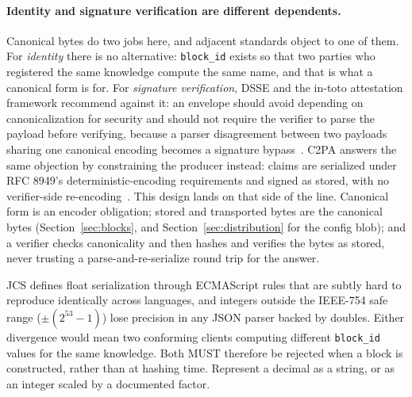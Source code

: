 \documentclass[11pt,a4paper]{article}
\begin{document}
\paragraph{Identity and signature verification are different dependents.}
Canonical bytes do two jobs here, and adjacent standards object to one of
them. For \emph{identity} there is no alternative: \texttt{block\_id} exists
so that two parties who registered the same knowledge compute the same name,
and that is what a canonical form is for. For \emph{signature verification},
DSSE and the in-toto attestation framework recommend against it: an envelope
should avoid depending on canonicalization for security and should not require
the verifier to parse the payload before verifying, because a parser
disagreement between two payloads sharing one canonical encoding becomes a
signature bypass~\cite{dsse,intoto_envelope}. C2PA answers the same objection
by constraining the producer instead: claims are serialized under RFC 8949's
deterministic-encoding requirements and signed as stored, with no verifier-side
re-encoding~\cite{c2pa_spec}. This design lands on that side of the line.
Canonical form is an encoder obligation; stored and transported bytes are the
canonical bytes (Section~\ref{sec:blocks}, and Section~\ref{sec:distribution}
for the config blob); and a verifier checks canonicality and then hashes and
verifies the bytes as stored, never trusting a parse-and-re-serialize round
trip for the answer.

\begin{callout}[title=Two value domains are excluded from a payload]
JCS defines float serialization through ECMAScript rules that are subtly hard to
reproduce identically across languages, and integers outside the IEEE-754 safe
range ($\pm(2^{53}-1)$) lose precision in any JSON parser backed by doubles.
Either divergence would mean two conforming clients computing different
\texttt{block\_id} values for the same knowledge. Both MUST therefore be
rejected when a block is constructed, rather than at hashing time. Represent a
decimal as a string, or as an integer scaled by a documented factor.
\end{callout}
\end{document}
